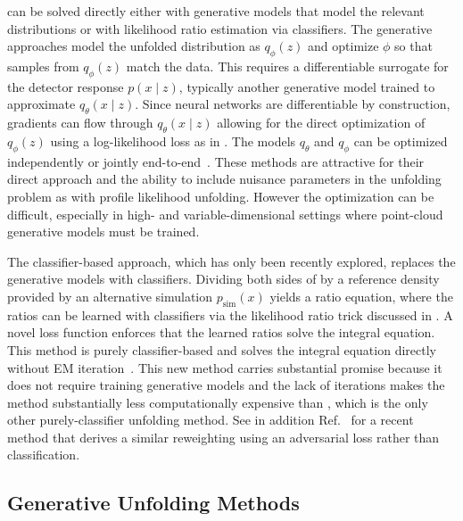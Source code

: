  can be solved directly either with generative models that model the relevant distributions or with likelihood ratio estimation via classifiers.
The generative approaches model the unfolded distribution as $q_\phi(z)$ and optimize $\phi$ so that samples from $q_\phi(z)$ match the data.
This requires a differentiable surrogate for the detector response $p(x \mid z)$, typically another generative model trained to approximate $q_\theta(x \mid z)$.
Since neural networks are differentiable by construction, gradients can flow through $q_\theta(x \mid z)$ allowing for the direct optimization of $q_\phi(z)$ using a log-likelihood loss as in .
The models $q_\theta$ and $q_\phi$ can be optimized independently or jointly end-to-end~\cite{Vandegar:2020yvw, Butter:2025via}.
These methods are attractive for their direct approach and the ability to include nuisance parameters in the unfolding problem as with profile likelihood unfolding.
However the optimization can be difficult, especially in high- and variable-dimensional settings where point-cloud generative models must be trained.

The classifier-based approach, which has only been recently explored, replaces the generative models with classifiers.
Dividing both sides of  by a reference density provided by an alternative simulation $p_{\mathrm{sim}}(x)$ yields a ratio equation, where the ratios can be learned with classifiers via the likelihood ratio trick discussed in .
A novel loss function enforces that the learned ratios solve the integral equation.
This method is purely classifier-based and solves the integral equation directly without EM iteration~\cite{Ore:2026qgp}.
This new method carries substantial promise because it does not require training generative models and the lack of iterations makes the method substantially less computationally expensive than \Omnifold, which is the only other purely-classifier unfolding method.
See in addition Ref.~\cite{Qureshi:2026oiv} for a recent method that derives a similar reweighting using an adversarial loss rather than classification.

\subsection{Generative Unfolding Methods}
\label{sec:generative-unfolding-methods}

